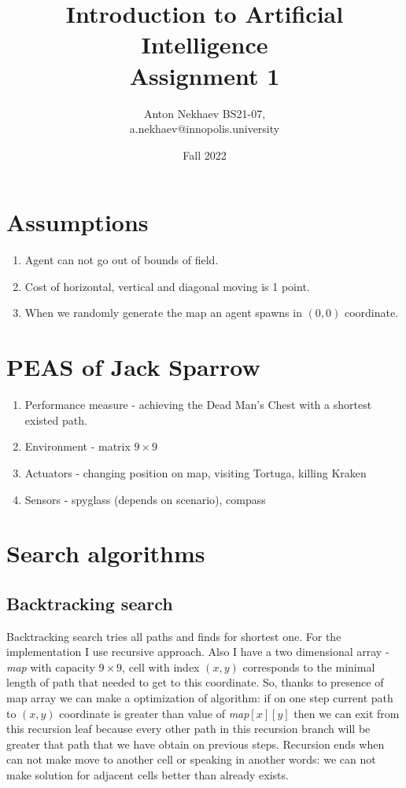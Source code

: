 \documentclass[a4paper]{article}
\title{Introduction to Artificial Intelligence \\ Assignment 1}
\author{Anton Nekhaev BS21-07, \\ a.nekhaev@innopolis.university}
\date{Fall 2022}
\begin{document}
\maketitle

\section{Assumptions}
\begin{enumerate}
  \item Agent can not go out of bounds of field.
  \item Cost of horizontal, vertical and diagonal moving is 1 point. 
  \item When we randomly generate the map an agent spawns in $(0, 0)$ coordinate.
\end{enumerate}

\section{PEAS of Jack Sparrow}
\begin{enumerate}
    \item[] Performance measure - achieving the Dead Man’s Chest with a shortest existed path. 
    \item[] Environment - matrix $9 \times 9$
    \item[] Actuators - changing position on map, visiting Tortuga, killing Kraken
    \item[] Sensors - spyglass (depends on scenario), compass
\end{enumerate}

\section{Search algorithms}
\subsection{Backtracking search}
Backtracking search tries all paths and finds for shortest one. For the implementation I use recursive approach. Also I have a two dimensional array - \emph{map} with capacity $9 \times 9$, cell with index $(x,y)$ corresponds to the minimal length of path that needed to get to this coordinate. So, thanks to presence of map array we can make a optimization of algorithm: if on one step current path to $(x, y)$ coordinate is greater than value of \emph{map}$[x][y]$ then we can exit from this recursion leaf because every other path in this recursion branch will be greater that path that we have obtain on previous steps. Recursion ends when can not make move to another cell or speaking in another words: we can not make solution for adjacent cells better than already exists.
\end{document}
